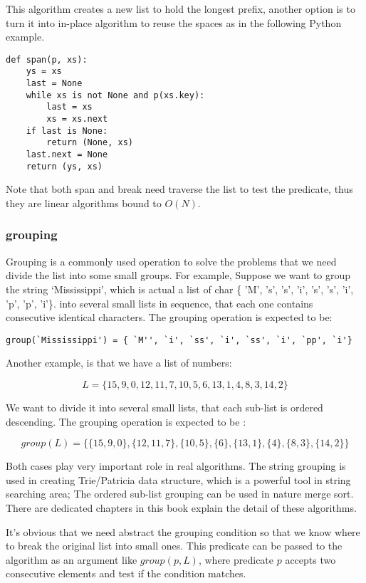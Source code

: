 \documentclass{article}
\begin{document}
This algorithm creates a new list to hold the longest prefix, another option is to turn it
into in-place algorithm to reuse the spaces as in the following Python example.

\lstset{language=Python}
\begin{lstlisting}
def span(p, xs):
    ys = xs
    last = None
    while xs is not None and p(xs.key):
        last = xs
        xs = xs.next
    if last is None:
        return (None, xs)
    last.next = None
    return (ys, xs)
\end{lstlisting}

Note that both span and break need traverse the list to test the predicate, thus they are linear
algorithms bound to $O(N)$.

\subsubsection{grouping}
Grouping is a commonly used operation to solve the problems that we need divide the list into some small groups.
For example, Suppose we want to group the 
string `Mississippi', which is actual a list of char \{ 'M', 's', 's', 'i', 's', 's', 'i', 'p', 'p', 'i'\}.
into several small lists in sequence, that each one contains consecutive identical characters. The grouping
operation is expected to be: 

\begin{verbatim}
group(`Mississippi') = { `M'', `i', `ss', `i', `ss', `i', `pp', `i'}
\end{verbatim}

Another example, is that we have a list of numbers:

\[
L = \{15, 9, 0, 12, 11, 7, 10, 5, 6, 13, 1, 4, 8, 3, 14, 2\}
\]

We want to divide it into several small lists, that each sub-list is ordered descending.
The grouping operation is expected to be :

\[
group(L) = \{ \{15, 9, 0\}, \{12, 11, 7\}, \{10, 5\}, \{6\}, \{13, 1\}, \{4\}, \{8, 3\}, \{14, 2\}\}
\]

Both cases play very important role in real algorithms. The string grouping is used in creating Trie/Patricia
data structure, which is a powerful tool in string searching area; The ordered sub-list grouping can be used in
nature merge sort. There are dedicated chapters in this book explain the detail of these algorithms.

It's obvious that we need abstract the grouping condition so that we know where to break the original list into
small ones. This predicate can be passed to the algorithm as an argument like $group(p, L)$, where predicate
$p$ accepts two consecutive elements and test if the condition matches.
\end{document}
